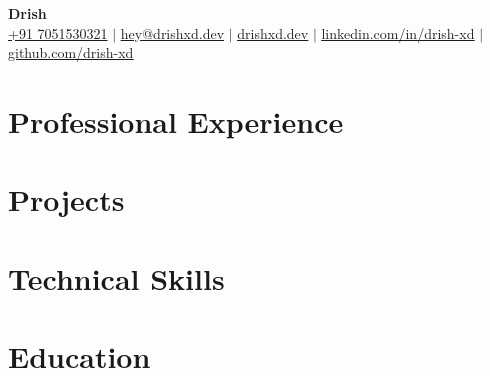 \documentclass[a4paper,11pt]{article}
\begin{document}
\begin{center}
    \textbf{\Huge Drish} \\ \vspace{1pt}
    \small
    \href{tel:+917051530321}{+91 7051530321}
    $|$
    \href{mailto:hey@drishxd.dev}{\ul{hey@drishxd.dev}}
    $|$
    \href{https://drishxd.dev}{\ul{drishxd.dev}}
    $|$
    \href{https://linkedin.com/in/drish-xd}{\ul{linkedin.com/in/drish-xd}}
    $|$
    \href{https://github.com/drish-xd}{\ul{github.com/drish-xd}}
\end{center}

\section{Professional Experience}
\sectionStart

\sectionEnd

\section{Projects}
\sectionStart

\sectionEnd

\section{Technical Skills}
\sectionStart
\li{
    
}
\sectionEnd

\section{Education}
\sectionStart

\vspace{2.5pt}
\sectionEnd

%     
\end{document}
